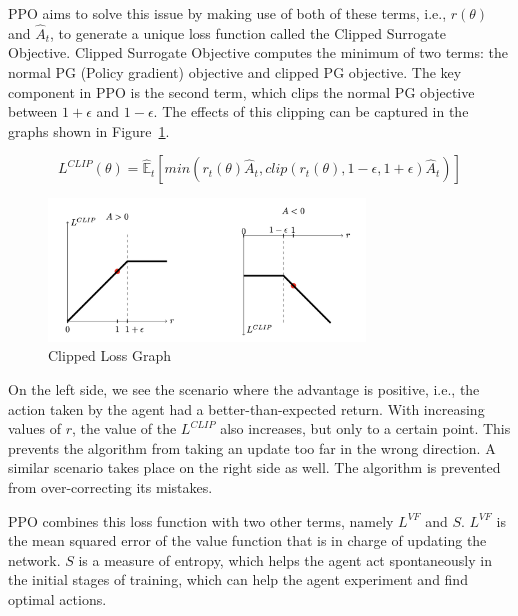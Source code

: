 PPO aims to solve this issue by making use of both of these terms,
i.e., $r(\theta)$ and $\hat{A}_{t}$, to generate a unique loss
function called the Clipped Surrogate Objective. Clipped Surrogate
Objective computes the minimum of two terms: the normal PG (Policy
gradient) objective and clipped PG objective. The key component in PPO
is the second term, which clips the normal PG objective between
$1 + \epsilon$ and $1 - \epsilon$. The effects of this clipping can be
captured in the graphs shown in Figure~\ref{fig:clipped-loss}.


\begin{equation}
    L^{CLIP}(\theta) = \hat{\mathbb{E}}_{t}[min(r_{t}(\theta) \hat{A}_{t}, clip(r_{t}(\theta), 1- \epsilon, 1 + \epsilon)\hat{A}_{t})]
\end{equation}

\begin{figure}[H]
    \centering
    \includegraphics[width=0.75\textwidth]{images/clipped-loss-graph.png}
    \caption{Clipped Loss Graph}
    \label{fig:clipped-loss}
\end{figure}


On the left side, we see the scenario where the advantage is positive,
i.e., the action taken by the agent had a better-than-expected
return. With increasing values of $r$, the value of the $L^{CLIP}$ also
increases, but only to a certain point. This prevents the algorithm
from taking an update too far in the wrong direction. A similar
scenario takes place on the right side as well. The algorithm is
prevented from over-correcting its mistakes.

PPO combines this loss function with two other terms, namely $L^{VF}$
and $S$. $L^{VF}$ is the mean squared error of the value function that
is in charge of updating the network. $S$ is a measure of entropy,
which helps the agent act spontaneously in the initial stages of
training, which can help the agent experiment and find optimal
actions.

